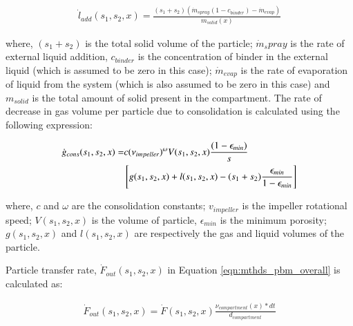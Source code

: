 \documentclass[preprint,11pt,authoryear]{elsarticle}
\begin{document}
\begin{align}
\dot{l}_{add}(s_1,s_2,x) = \frac{(s_1+s_2)(\dot{m}_{spray}(1-c_{binder})-\dot{m}_{evap})}{m_{solid}(x)}
\end{align}

where, $(s_1+s_2)$  is the total solid volume of the particle; $\dot{m}_spray$ is the rate of external 
liquid addition, $c_{binder}$ is the concentration of binder in the external liquid (which is assumed to 
be zero in this case); $\dot{m}_{evap}$ is the rate of evaporation of liquid from 
the system (which is also assumed to be zero in this case) and $m_{solid}$ is the total amount of solid 
present in the compartment.
The rate of decrease in gas volume per particle due to consolidation is calculated using the 
following expression: \citep{Verkoeijen2002} 

\begin{align}
\dot{g}_{cons}(s_1,s_2,x)=&c (\nu_{impeller})^{\omega}V(s_1,s_2,x)\frac{(1-\epsilon_{min})}{s} 
\notag \\ 
& \left[g(s_1,s_2,x)+l(s_1,s_2,x) -(s_1+s_2)\frac{\epsilon_{min}}{1-\epsilon_{min}}\right]
\end{align}        

 where, $c$ and $\omega$ are the consolidation constants; $v_{impeller}$ is the impeller 
rotational speed; $V(s_1,s_2,x)$ is the volume of particle, $\epsilon_{min}$ is the minimum porosity; 
$g(s_1,s_2,x)$ and $l(s_1,s_2,x)$ are respectively the gas and liquid volumes of the particle.

 Particle transfer rate, $\dot{F}_{out}(s_1,s_2,x)$ in Equation \ref{eqn:mthds_pbm_overall} is calculated 
as:

\begin{align}
\dot{F}_{out}(s_1,s_2,x) = \dot{F}(s_1,s_2,x)\frac{\nu_{compartment}(x)*dt}{d_{compartment}}
\end{align}
\end{document}
